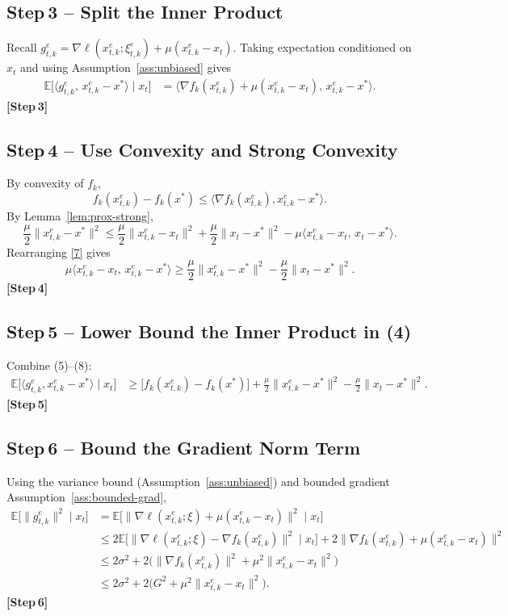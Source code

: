 \documentclass[11pt]{article}
\newcommand{\E}{\mathbb{E}}
\begin{document}
\subsection*{Step 3 – Split the Inner Product}
Recall $g_{t,k}^{e}= \nabla\ell(x_{t,k}^{e};\xi_{t,k}^{e})+\mu(x_{t,k}^{e}-x_t)$.
Taking expectation conditioned on $x_{t}$ and using
Assumption~\ref{ass:unbiased} gives
\begin{align}
\E\!\bigl[\langle g_{t,k}^{e},\,x_{t,k}^{e}-x^{\ast}\rangle\mid x_{t}\bigr]
&= \bigl\langle \nabla f_k(x_{t,k}^{e})+\mu(x_{t,k}^{e}-x_t),\,x_{t,k}^{e}-x^{\ast}\bigr\rangle. \tag{5}
\end{align}
\textbf{[Step 3]}

\subsection*{Step 4 – Use Convexity and Strong Convexity}
By convexity of $f_k$,
\[
f_k(x_{t,k}^{e})-f_k(x^{\ast})\le\langle\nabla f_k(x_{t,k}^{e}),x_{t,k}^{e}-x^{\ast}\rangle.
\tag{6}
\]
By Lemma~\ref{lem:prox-strong},
\[
\frac{\mu}{2}\|x_{t,k}^{e}-x^{\ast}\|^{2}
\le \frac{\mu}{2}\|x_{t,k}^{e}-x_t\|^{2}
   +\frac{\mu}{2}\|x_t-x^{\ast}\|^{2}
   -\mu\langle x_{t,k}^{e}-x_t,\,x_t-x^{\ast}\rangle.
\tag{7}
\]
Rearranging \eqref{7} gives
\[
\mu\langle x_{t,k}^{e}-x_t,\,x_{t,k}^{e}-x^{\ast}\rangle
\ge \frac{\mu}{2}\|x_{t,k}^{e}-x^{\ast}\|^{2}
   -\frac{\mu}{2}\|x_t-x^{\ast}\|^{2}. \tag{8}
\]
\textbf{[Step 4]}

\subsection*{Step 5 – Lower Bound the Inner Product in (4)}
Combine (5)–(8):
\begin{align}
\E\!\bigl[\langle g_{t,k}^{e},x_{t,k}^{e}-x^{\ast}\rangle\mid x_{t}\bigr]
&\ge
\bigl[f_k(x_{t,k}^{e})-f_k(x^{\ast})\bigr]
+ \frac{\mu}{2}\|x_{t,k}^{e}-x^{\ast}\|^{2}
- \frac{\mu}{2}\|x_t-x^{\ast}\|^{2}. \tag{9}
\end{align}
\textbf{[Step 5]}

\subsection*{Step 6 – Bound the Gradient Norm Term}
Using the variance bound (Assumption~\ref{ass:unbiased}) and bounded gradient
Assumption~\ref{ass:bounded-grad},
\begin{align}
\E\!\bigl[\|g_{t,k}^{e}\|^{2}\mid x_{t}\bigr]
&= \E\!\bigl[\|\nabla\ell(x_{t,k}^{e};\xi)+\mu(x_{t,k}^{e}-x_t)\|^{2}\mid x_{t}\bigr] \nonumber\\
&\le 2\E\!\bigl[\|\nabla\ell(x_{t,k}^{e};\xi)-\nabla f_k(x_{t,k}^{e})\|^{2}\mid x_{t}\bigr]
     +2\|\nabla f_k(x_{t,k}^{e})+\mu(x_{t,k}^{e}-x_t)\|^{2} \nonumber\\
&\le 2\sigma^{2}+2\bigl(\|\nabla f_k(x_{t,k}^{e})\|^{2}
          +\mu^{2}\|x_{t,k}^{e}-x_t\|^{2}\bigr) \nonumber\\
&\le 2\sigma^{2}+2\bigl(G^{2}+\mu^{2}\|x_{t,k}^{e}-x_t\|^{2}\bigr). \tag{10}
\end{align}
\textbf{[Step 6]}
\end{document}
